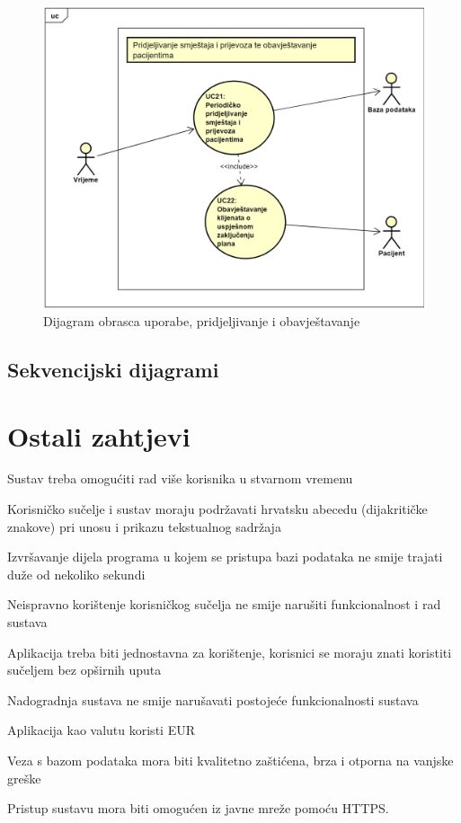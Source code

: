 				\begin{figure}[H]
					\centering
					\includegraphics[width=\textwidth]{slike/DOU_UC21UC22.png} %
					\caption{Dijagram obrasca uporabe, pridjeljivanje i obavještavanje}
					\label{fig:pridjeljivanje i obavještavanje}
				\end{figure}
				\eject		
				
			\subsection{Sekvencijski dijagrami}
			
			\eject	
	
		\section{Ostali zahtjevi}
		
			\begin{packed_item}
				\item Sustav treba omogućiti rad više korisnika u stvarnom vremenu
				\item Korisničko sučelje i sustav moraju podržavati hrvatsku abecedu (dijakritičke znakove) pri unosu i prikazu tekstualnog sadržaja
				\item Izvršavanje dijela programa u kojem se pristupa bazi podataka ne smije trajati duže od nekoliko sekundi
				\item Neispravno korištenje korisničkog sučelja ne smije narušiti funkcionalnost i rad sustava
				\item Aplikacija treba biti jednostavna za korištenje, korisnici se moraju znati koristiti sučeljem bez opširnih uputa
				\item Nadogradnja sustava ne smije narušavati postojeće funkcionalnosti sustava
				\item Aplikacija kao valutu koristi EUR
				\item Veza s bazom podataka mora biti kvalitetno zaštićena, brza i otporna na vanjske greške
				\item Pristup sustavu mora biti omogućen iz javne mreže pomoću HTTPS.
			\end{packed_item}			 